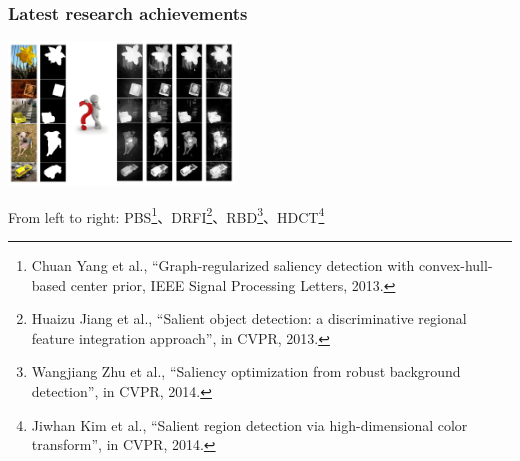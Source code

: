 \documentclass[notheorems,serif,table,compress]{beamer}  %
\begin{document}
%
%


\begin{frame}
\frametitle{Latest research achievements}
\centering\includegraphics[width=6cm]{latest}

  From left to right: PBS\footnote{Chuan Yang et al., ``Graph-regularized saliency detection with convex-hull-based center prior, IEEE Signal Processing Letters, 2013.}、DRFI\footnote{Huaizu Jiang et al., ``Salient object detection: a discriminative regional feature integration approach'', in CVPR, 2013.}、RBD\footnote{Wangjiang Zhu et al., ``Saliency optimization from robust background detection'', in CVPR, 2014.}、HDCT\footnote{Jiwhan Kim et al., ``Salient region detection via high-dimensional color transform'', in CVPR, 2014.}
\end{frame}
\end{document}
